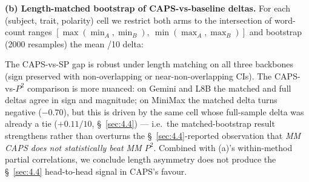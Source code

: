 \textbf{(b) Length-matched bootstrap of CAPS-vs-baseline deltas.} For each (subject, trait, polarity) cell we restrict both arms to the intersection of word-count ranges $[\max(\min_A,\min_B),\ \min(\max_A,\max_B)]$ and bootstrap (2000 resamples) the mean /10 delta:

\begin{table}[t]
\centering
{}
\caption{Length-matched bootstrap of the \S~\ref{sec:4.4} CAPS-vs-baseline deltas, restricting both arms per cell to the intersection of their word-count ranges. All three CAPS$-$SP gaps keep their sign; on CAPS$-$$P^{\!2}$ only the MM cell changes sign, and it does so on the one cell whose full-sample delta was already a tie ($+0.11$, \S~\ref{sec:4.4}).}
\label{tab:length-matched}
\end{table}

The CAPS-vs-SP gap is robust under length matching on all three backbones (sign preserved with non-overlapping or near-non-overlapping CIs). The CAPS-vs-$P^{\!2}$ comparison is more nuanced: on Gemini and L8B the matched and full deltas agree in sign and magnitude; on MiniMax the matched delta turns negative ($-0.70$), but this is driven by the same cell whose full-sample delta was already a tie ($+0.11/10$, \S~\ref{sec:4.4}) --- i.e.\ the matched-bootstrap result strengthens rather than overturns the \S~\ref{sec:4.4}-reported observation that \textit{MM CAPS does not statistically beat MM $P^{\!2}$}. Combined with (a)'s within-method partial correlations, we conclude length asymmetry does not produce the \S~\ref{sec:4.4} head-to-head signal in CAPS's favour.


